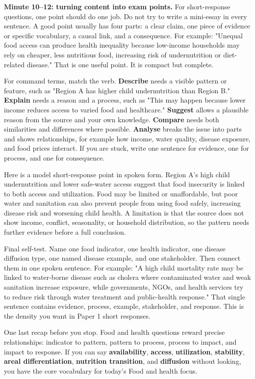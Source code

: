 \documentclass[11pt,a4paper]{article}
\newcommand{\term}[1]{\textcolor{HeadingBlue}{\textbf{#1}}}
\newcommand{\exam}[1]{\textcolor{AccentTeal}{\textbf{#1}}}
\begin{document}
\textbf{Minute 10--12: turning content into exam points.}
For short-response questions, one point should do one job. Do not try to write a
mini-essay in every sentence. A good point usually has four parts: a clear claim,
one piece of evidence or specific vocabulary, a causal link, and a consequence.
For example: "Unequal food access can produce health inequality because
low-income households may rely on cheaper, less nutritious food, increasing risk
of undernutrition or diet-related disease." That is one useful point. It is
compact but complete.

For command terms, match the verb. \exam{Describe} needs a visible pattern or
feature, such as "Region A has higher child undernutrition than Region B."
\exam{Explain} needs a reason and a process, such as "This may happen because
lower income reduces access to varied food and healthcare." \exam{Suggest}
allows a plausible reason from the source and your own knowledge. \exam{Compare}
needs both similarities and differences where possible. \exam{Analyse} breaks
the issue into parts and shows relationships, for example how income, water
quality, disease exposure, and food prices interact. If you are stuck, write one
sentence for evidence, one for process, and one for consequence.

Here is a model short-response point in spoken form. Region A's high child
undernutrition and lower safe-water access suggest that food insecurity is
linked to both access and utilization. Food may be limited or unaffordable, but
poor water and sanitation can also prevent people from using food safely,
increasing disease risk and worsening child health. A limitation is that the
source does not show income, conflict, seasonality, or household distribution,
so the pattern needs further evidence before a full conclusion.

Final self-test. Name one food indicator, one health indicator, one disease
diffusion type, one named disease example, and one stakeholder. Then connect
them in one spoken sentence. For example: "A high child mortality rate may be
linked to water-borne disease such as cholera where contaminated water and weak
sanitation increase exposure, while governments, NGOs, and health services try
to reduce risk through water treatment and public-health response." That single
sentence contains evidence, process, example, stakeholder, and response. This is
the density you want in Paper 1 short responses.

One last recap before you stop. Food and health questions reward precise
relationships: indicator to pattern, pattern to process, process to impact, and
impact to response. If you can say \term{availability}, \term{access},
\term{utilization}, \term{stability}, \term{areal differentiation},
\term{nutrition transition}, and \term{diffusion} without looking, you have the
core vocabulary for today's Food and health focus.
\end{document}
